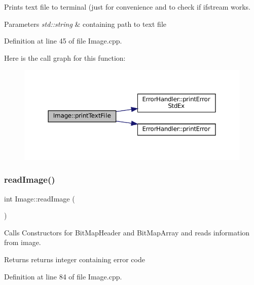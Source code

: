 Prints text file to terminal (just for convenience and to check if ifstream works. 


\begin{DoxyParams}{Parameters}
{\em std\+::string} & containing path to text file \\
\hline
\end{DoxyParams}


Definition at line 45 of file Image.\+cpp.

Here is the call graph for this function\+:
\nopagebreak
\begin{figure}[H]
\begin{center}
\leavevmode
\includegraphics[width=350pt]{classImage_ae5daf791502caefeae1b15360d354513_cgraph}
\end{center}
\end{figure}
\mbox{\label{classImage_ac0aa1f41cb368d87b20dd38839218d93}} 
\subsubsection{\texorpdfstring{readImage()}{readImage()}}
{\footnotesize\ttfamily int Image\+::read\+Image (\begin{DoxyParamCaption}{ }\end{DoxyParamCaption})}



Calls Constructors for Bit\+Map\+Header and Bit\+Map\+Array and reads information from image. 

\begin{DoxyReturn}{Returns}
returns integer containing error code 
\end{DoxyReturn}


Definition at line 84 of file Image.\+cpp.

